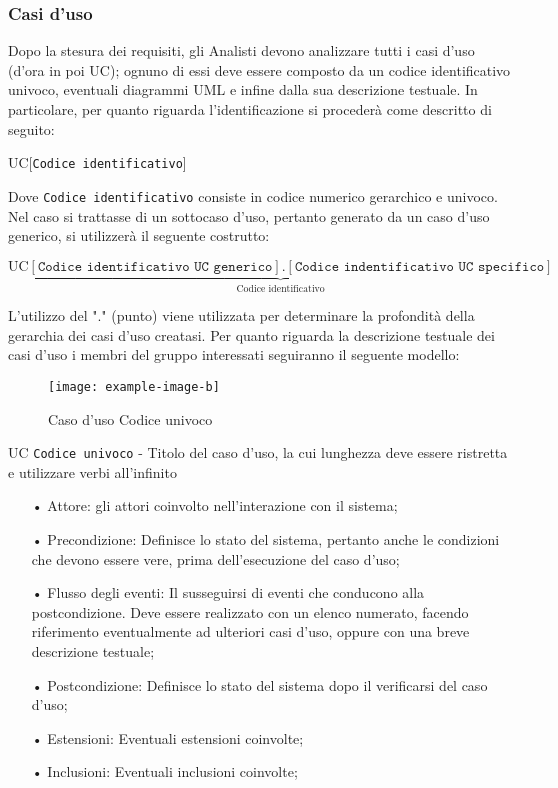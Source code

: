\subsubsection{Casi d'uso}
Dopo la stesura dei requisiti, gli Analisti devono analizzare tutti i casi d'uso (d'ora in poi UC); ognuno di essi deve essere composto da un codice identificativo univoco, eventuali diagrammi UML e infine dalla sua descrizione testuale. In particolare, per quanto riguarda l'identificazione si procederà come descritto di seguito:
\begin{center}
UC[\texttt{Codice identificativo}]
\end{center}
Dove \texttt{Codice identificativo} consiste in codice numerico gerarchico e univoco.
Nel caso si trattasse di un {sottocaso d'uso}, pertanto generato da un caso d'uso generico, si utilizzerà il seguente costrutto:
\begin{center}
$\text{UC}\underbrace{[\texttt{Codice identificativo UC generico}].[\texttt{Codice indentificativo UC specifico}]}_{\text{Codice   identificativo}}$
\end{center}
L'utilizzo del "." (punto) viene utilizzata per determinare la profondità della gerarchia dei casi d'uso creatasi.
Per quanto riguarda la descrizione testuale dei casi d'uso i membri del gruppo interessati seguiranno il seguente modello:
\begin{figure}[H]
\centering
\texttt{[image: example-image-b]}
\caption{Caso d'uso Codice univoco}
\end{figure}
UC \texttt{Codice univoco} - Titolo del caso d'uso, la cui lunghezza deve essere ristretta e utilizzare verbi all'infinito
\begin{itemize}
\item[•] Attore: gli attori coinvolto nell'interazione con il sistema;
\item[•] Precondizione: Definisce lo stato del sistema, pertanto anche le condizioni che devono essere vere, prima dell'esecuzione del caso d'uso;
\item[•] Flusso degli eventi: Il susseguirsi di eventi che conducono alla postcondizione. Deve essere realizzato con un elenco numerato, facendo riferimento eventualmente ad ulteriori casi d'uso, oppure con una breve descrizione testuale;
\item[•] Postcondizione: Definisce lo stato del sistema dopo il verificarsi del caso d'uso; 
\item[•] Estensioni: Eventuali estensioni coinvolte;
\item[•] Inclusioni: Eventuali inclusioni coinvolte;
\end{itemize}



